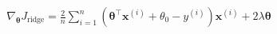 \documentclass[preview]{standalone}
\begin{document}
\begin{align*}
\nabla_{\mathbf{\theta}}J_{\text{ridge}} = \frac{2}{n} \sum_{i=1}^n \left(\mathbf{\theta}^{\top}\mathbf{x}^{(i)} + \theta_0 - y^{(i)}\right)\mathbf{x}^{(i)} + 2\lambda \mathbf{\theta}
\end{align*}
\end{document}
